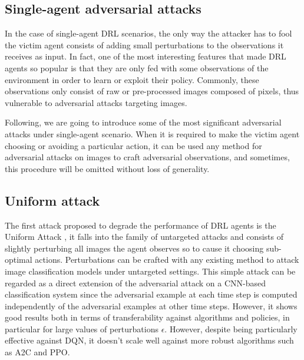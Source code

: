 \subsection{Single-agent adversarial attacks}
In the case of single-agent DRL scenarios, the only way the attacker has to fool the victim agent consists of adding small perturbations to the observations it receives as input. In fact, one of the most interesting features that made DRL agents so popular is that they are only fed with some observations of the environment in order to learn or exploit their policy. Commonly, these observations only consist of raw or pre-processed images composed of pixels, thus vulnerable to adversarial attacks targeting images.

Following, we are going to introduce some of the most significant adversarial attacks under single-agent scenario. When it is required to make the victim agent choosing or avoiding a particular action, it can be used any method for adversarial attacks on images to craft adversarial observations, and sometimes, this procedure will be omitted without loss of generality.

\subsection{Uniform attack}
The first attack proposed to degrade the performance of DRL agents is the Uniform Attack \cite{s2017adversarial}, it falls into the family of untargeted attacks and consists of slightly perturbing all images the agent observes so to cause it choosing sub-optimal actions. Perturbations can be crafted with any existing method to attack image classification models under untargeted settings. This simple attack can be regarded as a direct extension of the adversarial attack on a CNN-based classification system since the adversarial example at each time step is computed independently of the adversarial examples at other time steps. However, it shows good results both in terms of transferability against algorithms and policies, in particular for large values of perturbations \(\epsilon\). However, despite being particularly effective against DQN, it doesn't scale well against more robust algorithms such as A2C and PPO.


